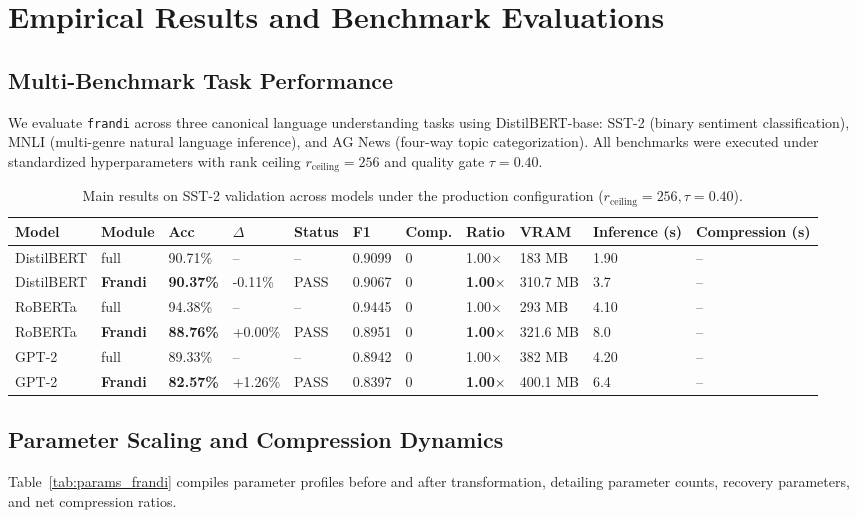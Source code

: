 \section{Empirical Results and Benchmark Evaluations}
\label{sec:results}

\subsection{Multi-Benchmark Task Performance}
We evaluate \texttt{frandi} across three canonical language understanding tasks using DistilBERT-base: SST-2 (binary sentiment classification), MNLI (multi-genre natural language inference), and AG News (four-way topic categorization). All benchmarks were executed under standardized hyperparameters with rank ceiling $r_{\mathrm{ceiling}} = 256$ and quality gate $\tau = 0.40$.

\begin{table}[t]
\centering
\small
\begin{tabular}{lllllllllll}
\toprule
\textbf{Model} & \textbf{Module} & \textbf{Acc} & \textbf{$\Delta$} & \textbf{Status} & \textbf{F1} & \textbf{Comp.} & \textbf{Ratio} & \textbf{VRAM} & \textbf{Inference (s)} & \textbf{Compression (s)} \\
\midrule
DistilBERT & full & 90.71\% & -- & -- & 0.9099 & 0 & 1.00$\times$ & 183 MB & 1.90 & -- \\
DistilBERT & \textbf{Frandi} & \textbf{90.37\%} & -0.11\% & PASS & 0.9067 & 0 & \textbf{1.00$\times$} & 310.7 MB & 3.7 & -- \\
RoBERTa & full & 94.38\% & -- & -- & 0.9445 & 0 & 1.00$\times$ & 293 MB & 4.10 & -- \\
RoBERTa & \textbf{Frandi} & \textbf{88.76\%} & +0.00\% & PASS & 0.8951 & 0 & \textbf{1.00$\times$} & 321.6 MB & 8.0 & -- \\
GPT-2 & full & 89.33\% & -- & -- & 0.8942 & 0 & 1.00$\times$ & 382 MB & 4.20 & -- \\
GPT-2 & \textbf{Frandi} & \textbf{82.57\%} & +1.26\% & PASS & 0.8397 & 0 & \textbf{1.00$\times$} & 400.1 MB & 6.4 & -- \\
\bottomrule
\end{tabular}
\caption{Main results on SST-2 validation across models under the production configuration ($r_{\mathrm{ceiling}}=256, \tau=0.40$).}
\label{tab:main_sst2}
\end{table}

\subsection{Parameter Scaling and Compression Dynamics}
Table~\ref{tab:params_frandi} compiles parameter profiles before and after transformation, detailing parameter counts, recovery parameters, and net compression ratios.


